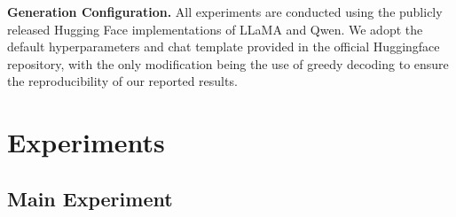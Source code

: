 \documentclass[sigconf,natbib=true,anonymous=false]{acmart}
\begin{document}
\textbf{Generation Configuration.} 
All experiments are conducted using the publicly released Hugging Face implementations of LLaMA and Qwen. 
We adopt the default hyperparameters and chat template provided in the official Huggingface repository, with the only modification being the use of greedy decoding to ensure the reproducibility of our reported results.





\section{Experiments}


\subsection{Main Experiment}
\end{document}
